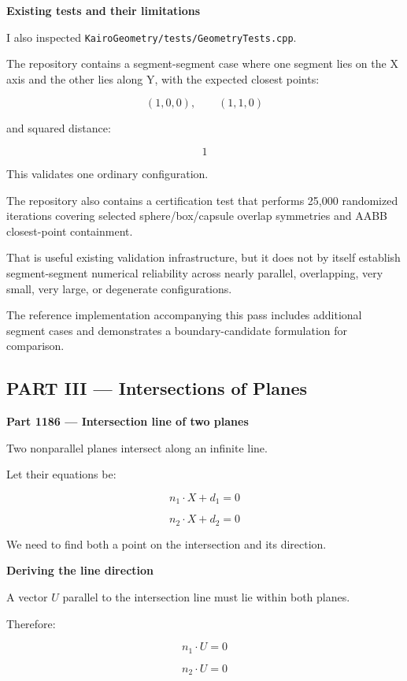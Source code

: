 \textbf{Existing tests and their limitations}

I also inspected \texttt{KairoGeometry/tests/GeometryTests.cpp}.

The repository contains a segment-segment case where one segment lies on the X axis and the other lies along Y, with the expected closest points:

\[
(1,0,0),\qquad(1,1,0)
\]

and squared distance:

\[
1
\]

This validates one ordinary configuration.

The repository also contains a certification test that performs 25,000 randomized iterations covering selected sphere/box/capsule overlap symmetries and AABB closest-point containment.

That is useful existing validation infrastructure, but it does not by itself establish segment-segment numerical reliability across nearly parallel, overlapping, very small, very large, or degenerate configurations.

The reference implementation accompanying this pass includes additional segment cases and demonstrates a boundary-candidate formulation for comparison.

\subsection{PART III --- Intersections of Planes}\label{04-visual-computing-ii-ch022-part-iii-intersections-of-planes}

\hypertarget{04-visual-computing-ii-ch022-part-iii-intersections-of-planes}{}

\textbf{Part 1186 --- Intersection line of two planes}

Two nonparallel planes intersect along an infinite line.

Let their equations be:

\[
n_1\cdot X+d_1=0
\]

\[
n_2\cdot X+d_2=0
\]

We need to find both a point on the intersection and its direction.

\textbf{Deriving the line direction}

A vector \(U\) parallel to the intersection line must lie within both planes.

Therefore:

\[
n_1\cdot U=0
\]

\[
n_2\cdot U=0
\]

